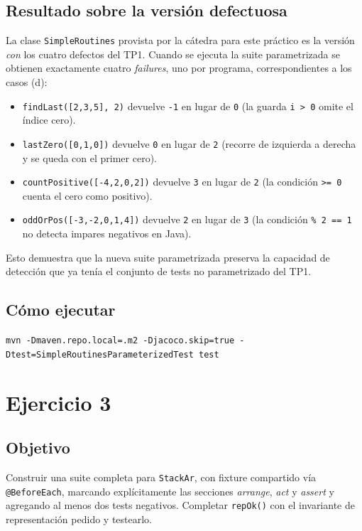 \documentclass[12pt,a4paper]{article}
\begin{document}
\subsection{Resultado sobre la versión defectuosa}
La clase \texttt{SimpleRoutines} provista por la cátedra para este práctico es la versión \textit{con} los cuatro defectos del TP1. Cuando se ejecuta la suite parametrizada se obtienen exactamente cuatro \textit{failures}, uno por programa, correspondientes a los casos (d):
\begin{itemize}
  \item \texttt{findLast([2,3,5], 2)} devuelve \texttt{-1} en lugar de \texttt{0} (la guarda \texttt{i > 0} omite el índice cero).
  \item \texttt{lastZero([0,1,0])} devuelve \texttt{0} en lugar de \texttt{2} (recorre de izquierda a derecha y se queda con el primer cero).
  \item \texttt{countPositive([-4,2,0,2])} devuelve \texttt{3} en lugar de \texttt{2} (la condición \texttt{>= 0} cuenta el cero como positivo).
  \item \texttt{oddOrPos([-3,-2,0,1,4])} devuelve \texttt{2} en lugar de \texttt{3} (la condición \texttt{\% 2 == 1} no detecta impares negativos en Java).
\end{itemize}

Esto demuestra que la nueva suite parametrizada preserva la capacidad de detección que ya tenía el conjunto de tests no parametrizado del TP1.

\subsection{Cómo ejecutar}
\begin{center}
\texttt{mvn -Dmaven.repo.local=.m2 -Djacoco.skip=true -Dtest=SimpleRoutinesParameterizedTest test}
\end{center}

\section{Ejercicio 3}
\subsection{Objetivo}
Construir una suite completa para \texttt{StackAr}, con fixture compartido vía \texttt{@BeforeEach}, marcando explícitamente las secciones \textit{arrange}, \textit{act} y \textit{assert} y agregando al menos dos tests negativos. Completar \texttt{repOk()} con el invariante de representación pedido y testearlo.
\end{document}

